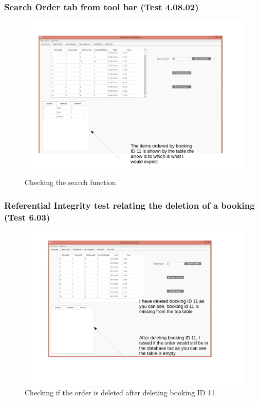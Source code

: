 \begin{landscape}
\subsubsection{Search Order tab from tool bar (Test 4.08.02)}

\begin{figure}[H]
    \includegraphics[width = 20cm]{./Testing/images/booking11.pdf}
    \caption{Checking the search function} \label{fig:searchFunction}
\end{figure}

\subsubsection{Referential Integrity test relating the deletion of a booking (Test 6.03)}

\begin{figure}[H]
    \includegraphics[width = 20cm]{./Testing/images/booking11delete.pdf}
    \caption{Checking if the order is deleted after deleting booking ID 11} \label{fig:searchDeletedBooking}
\end{figure}






\end{landscape}

